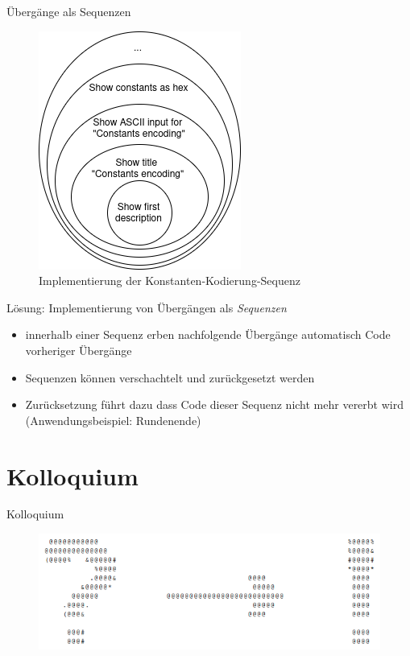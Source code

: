 \documentclass{beamer}
\begin{document}
\begin{frame}{Übergänge als Sequenzen}
\begin{figure}
\center
\begin{minipage}{.3\textwidth}
\includegraphics[width=\textwidth]{figures/onion.png}
\end{minipage}
\caption{Implementierung der Konstanten-Kodierung-Sequenz}
\end{figure}
Lösung: Implementierung von Übergängen als \textit{Sequenzen}
\begin{itemize}
\item innerhalb einer Sequenz erben nachfolgende Übergänge automatisch Code vorheriger Übergänge
\item Sequenzen können verschachtelt und zurückgesetzt werden
\item Zurücksetzung führt dazu dass Code dieser Sequenz nicht mehr vererbt wird (Anwendungsbeispiel: Rundenende)
\end{itemize}
\end{frame}

\section{Kolloquium}
\begin{frame}{Kolloquium}
\begin{figure}
\center
\begin{minipage}{0.8\textwidth}
\includegraphics[width=\textwidth]{figures/kolloquium/kolloquium-ascii-art.png}
\end{minipage}
\end{figure}
\end{frame}
\end{document}
